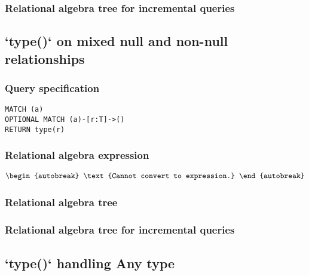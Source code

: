 
\subsubsection*{Relational algebra tree for incremental queries}


\subsection{`type()` on mixed null and non-null relationships}

\subsubsection*{Query specification}

\begin{lstlisting}
MATCH (a)
OPTIONAL MATCH (a)-[r:T]->()
RETURN type(r)
\end{lstlisting}

\subsubsection*{Relational algebra expression}

\begin{align*}
\begin{autobreak}
\text{Cannot convert to expression.}
\end{autobreak}
\end{align*}

\subsubsection*{Relational algebra tree}


\subsubsection*{Relational algebra tree for incremental queries}


\subsection{`type()` handling Any type}

